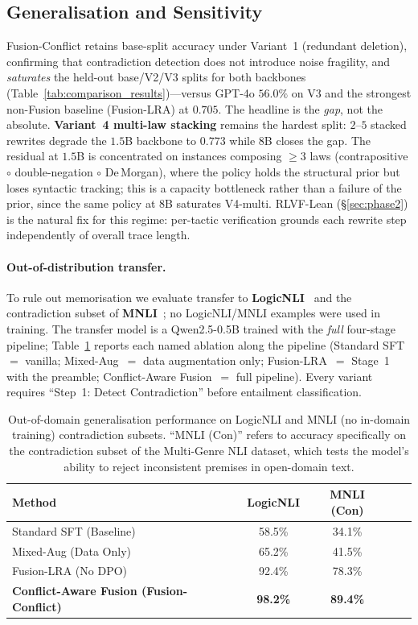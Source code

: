 \documentclass{article}
\begin{document}
\subsection{Generalisation and Sensitivity}
Fusion-Conflict retains base-split accuracy under Variant~1 (redundant deletion), confirming that contradiction detection does not introduce noise fragility, and \emph{saturates} the held-out base/V2/V3 splits for both backbones (Table~\ref{tab:comparison_results})---versus GPT-4o $56.0\%$ on V3 and the strongest non-Fusion baseline (Fusion-LRA) at $0.705$. The headline is the \emph{gap}, not the absolute. \textbf{Variant~4 multi-law stacking} remains the hardest split: $2$--$5$ stacked rewrites degrade the $1.5$B backbone to $0.773$ while $8$B closes the gap. The residual at $1.5$B is concentrated on instances composing $\geq 3$ laws (contrapositive $\circ$ double-negation $\circ$ De\,Morgan), where the policy holds the structural prior but loses syntactic tracking; this is a capacity bottleneck rather than a failure of the prior, since the same policy at $8$B saturates V4-multi. RLVF-Lean (\S\ref{sec:phase2}) is the natural fix for this regime: per-tactic verification grounds each rewrite step independently of overall trace length.

\paragraph{Out-of-distribution transfer.} To rule out memorisation we evaluate transfer to \textbf{LogicNLI}~\cite{tian-etal-2021-diagnosing} and the contradiction subset of \textbf{MNLI}~\cite{N18-1101}; no LogicNLI/MNLI examples were used in training. The transfer model is a Qwen2.5-0.5B trained with the \emph{full} four-stage pipeline; Table~\ref{tab:real_world_results} reports each named ablation along the pipeline (Standard SFT~$=$ vanilla; Mixed-Aug~$=$ data augmentation only; Fusion-LRA~$=$ Stage~1 with the preamble; Conflict-Aware Fusion~$=$ full pipeline). Every variant requires ``Step~1: Detect Contradiction'' before entailment classification.

\begin{table}[h]
    \centering
    \begin{tabular}{lcccc}
        \toprule
        \textbf{Method} & \textbf{LogicNLI} & \textbf{MNLI (Con)} \\
        \midrule
        Standard SFT (Baseline) & 58.5\% & 34.1\% \\
        Mixed-Aug (Data Only) & 65.2\% & 41.5\% \\
        Fusion-LRA (No DPO) & 92.4\% & 78.3\% \\
        \rowcolor{gray!10} \textbf{Conflict-Aware Fusion (Fusion-Conflict)} & \textbf{98.2\%} & \textbf{89.4\%} \\
        \bottomrule
    \end{tabular}
    \caption{Out-of-domain generalisation performance on LogicNLI and MNLI (no in-domain training) contradiction subsets. ``MNLI (Con)'' refers to accuracy specifically on the contradiction subset of the Multi-Genre NLI dataset, which tests the model's ability to reject inconsistent premises in open-domain text.}
    \label{tab:real_world_results}
\end{table}
\end{document}
